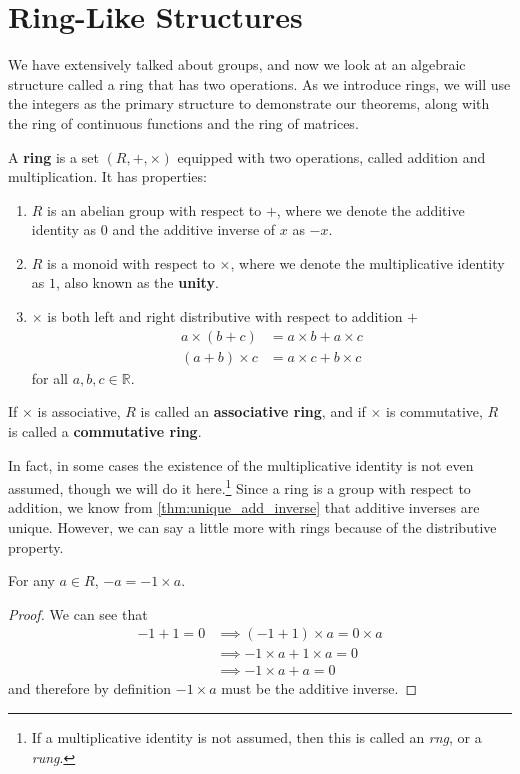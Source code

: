 \section{Ring-Like Structures} 

  We have extensively talked about groups, and now we look at an algebraic structure called a ring that has two operations. As we introduce rings, we will use the integers as the primary structure to demonstrate our theorems, along with the ring of continuous functions and the ring of matrices. 

  \begin{definition}[Ring]
    A \textbf{ring} is a set $(R, +, \times)$ equipped with two operations, called addition and multiplication. It has properties: 
    \begin{enumerate}
      \item $R$ is an abelian group with respect to $+$, where we denote the additive identity as $0$ and the additive inverse of $x$ as $-x$. 
      \item $R$ is a monoid with respect to $\times$, where we denote the multiplicative identity as $1$, also known as the \textbf{unity}. 
      \item $\times$ is both left and right distributive with respect to addition $+$
      \begin{align}
        a \times (b + c) & = a\times b + a\times c \\ 
        (a + b) \times c & = a\times c + b\times c 
      \end{align}
      for all $a, b, c \in \mathbb{R}$. 
    \end{enumerate} 
    If $\times$ is associative, $R$ is called an \textbf{associative ring}, and if $\times$ is commutative, $R$ is called a \textbf{commutative ring}. 
  \end{definition}

  In fact, in some cases the existence of the multiplicative identity is not even assumed, though we will do it here.\footnote{If a multiplicative identity is not assumed, then this is called an \textit{rng}, or a \textit{rung}.} Since a ring is a group with respect to addition, we know from \ref{thm:unique_add_inverse} that additive inverses are unique. However, we can say a little more with rings because of the distributive property. 

  \begin{lemma} 
    For any $a \in R$, $-a = -1 \times a$. 
  \end{lemma}
  \begin{proof}
    We can see that 
    \begin{align}
      -1 + 1 = 0 & \implies (-1 + 1) \times a = 0 \times a \\
                 & \implies -1 \times a + 1 \times a = 0 \\
                 & \implies -1 \times a + a = 0 
    \end{align}
    and therefore by definition $-1 \times a$ must be the additive inverse. 
  \end{proof} 

